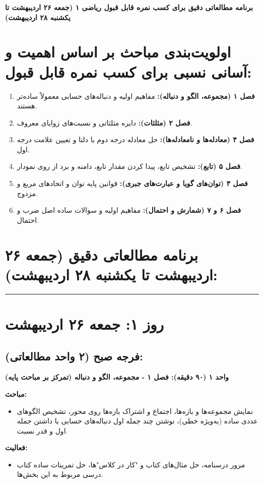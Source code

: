 \documentclass[12pt,a4paper]{article}
\newcommand{\studyunit}[1]{\par\medskip\noindent\textbf{#1}\par\nopagebreak}
\newcommand{\topics}{\par\medskip\noindent\textbf{مباحث:}\begin{itemize}[nosep,after=\vspace{-0.5\baselineskip}]}
\newcommand{\activities}{\par\medskip\noindent\textbf{فعالیت:}\begin{itemize}[nosep,after=\vspace{-0.5\baselineskip}]}
\begin{document}
\begin{center}
\Large\textbf{برنامه مطالعاتی دقیق برای کسب نمره قابل قبول ریاضی ۱ (جمعه ۲۶ اردیبهشت تا یکشنبه ۲۸ اردیبهشت)}
\end{center}
\hrulefill
\vspace{1em}

\section*{اولویت‌بندی مباحث بر اساس اهمیت و آسانی نسبی برای کسب نمره قابل قبول:}
\begin{enumerate}[label=\arabic*., itemsep=0.2em, topsep=0.3em]
    \item \textbf{فصل ۱ (مجموعه، الگو و دنباله):} مفاهیم اولیه و دنباله‌های حسابی معمولاً ساده‌تر هستند.
    \item \textbf{فصل ۲ (مثلثات):} دایره مثلثاتی و نسبت‌های زوایای معروف.
    \item \textbf{فصل ۴ (معادله‌ها و نامعادله‌ها):} حل معادله درجه دوم با دلتا و تعیین علامت درجه اول.
    \item \textbf{فصل ۵ (تابع):} تشخیص تابع، پیدا کردن مقدار تابع، دامنه و برد از روی نمودار.
    \item \textbf{فصل ۳ (توان‌های گویا و عبارت‌های جبری):} قوانین پایه توان و اتحادهای مربع و مزدوج.
    \item \textbf{فصل ۶ و ۷ (شمارش و احتمال):} مفاهیم اولیه و سوالات ساده اصل ضرب و احتمال.
\end{enumerate}
\vspace{1em}

\section*{برنامه مطالعاتی دقیق (جمعه ۲۶ اردیبهشت تا یکشنبه ۲۸ اردیبهشت):}
\rule{\linewidth}{0.4pt}\vspace{1em}

\section*{روز ۱: جمعه ۲۶ اردیبهشت}

\subsection*{فرجه صبح (۲ واحد مطالعاتی):}
    \studyunit{واحد ۱ (۹۰ دقیقه): فصل ۱ - مجموعه، الگو و دنباله (تمرکز بر مباحث پایه)}
        \topics
            \item نمایش مجموعه‌ها و بازه‌ها، اجتماع و اشتراک بازه‌ها روی محور، تشخیص الگوهای عددی ساده (به‌ویژه خطی)، نوشتن چند جمله اول دنباله‌های حسابی با داشتن جمله اول و قدر نسبت.
        \end{itemize}
        \activities
            \item مرور درسنامه، حل مثال‌های کتاب و "کار در کلاس"ها، حل تمرینات ساده کتاب درسی مربوط به این بخش‌ها.
        \end{itemize}
\end{document}
